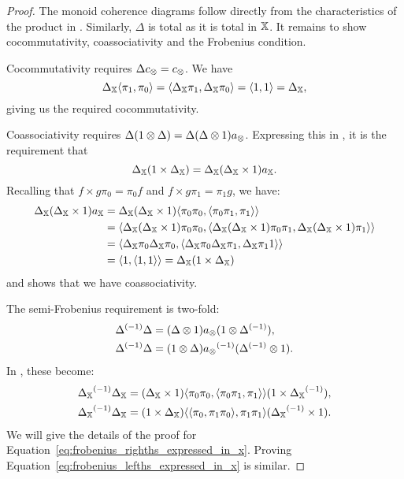 \begin{proof}
  The monoid coherence diagrams follow directly from the characteristics of the product in
  \X. Similarly, $\Delta$ is total as it is total in $\mathbb{X}$. It remains to show cocommutativity,
  coassociativity and the Frobenius condition.

  Cocommutativity requires $\Delta c_{\otimes} = c_{\otimes}$. We have
  \[
     \Delta_{\mathbb{X}} \langle \pi_1,\pi_0\rangle = \langle\Delta_{\mathbb{X}}\pi_1, \Delta_{\mathbb{X}}\pi_0\rangle = \langle1,1\rangle =
     \Delta_{\mathbb{X}},
  \]
  giving us the required cocommutativity.

  Coassociativity requires $\Delta (1 \otimes \Delta) = \Delta (\Delta \otimes 1) a_{\otimes}$. Expressing this
  in \X, it is the requirement that
  \[
    \Delta_{\mathbb{X}} (1 \times \Delta_{\mathbb{X}}) =
      \Delta_{\mathbb{X}}(\Delta_{\mathbb{X}} \times 1) a_{\mathbb{X}}.
  \]
  Recalling that $f\times g \pi_0 = \pi_0 f$ and $f\times g \pi_1 = \pi_1 g$, we have:
  \begin{align*}
    \Delta_{\mathbb{X}}(\Delta_{\mathbb{X}} \times 1) a_{\mathbb{X}} &=\Delta_{\mathbb{X}}(\Delta_{\mathbb{X}} \times 1)
    \langle\pi_0\pi_0,\langle\pi_0\pi_1,\pi_1\rangle\rangle\\
    &= \langle\Delta_{\mathbb{X}}(\Delta_{\mathbb{X}} \times 1)\pi_0\pi_0,\langle\Delta_{\mathbb{X}}(\Delta_{\mathbb{X}} \times 1)\pi_0\pi_1,\Delta_{\mathbb{X}}(\Delta_{\mathbb{X}} \times 1)\pi_1\rangle\rangle\\
    &= \langle\Delta_{\mathbb{X}}\pi_0\Delta_{\mathbb{X}}\pi_0,\langle\Delta_{\mathbb{X}}\pi_0\Delta_{\mathbb{X}}\pi_1,\Delta_{\mathbb{X}}\pi_1 1\rangle\rangle\\
    &= \langle1, \langle1,1\rangle\rangle = \Delta_{\mathbb{X}}(1\times\Delta_{\mathbb{X}})
  \end{align*}
  and shows that we have coassociativity.

  The semi-Frobenius requirement is two-fold:
  \begin{align}
    {\Delta}^{(-1)} \Delta &= (\Delta \otimes1) a_{\otimes}(1\otimes{\Delta}^{(-1)}), \label{eq:frobenius_righths_need_in_invx}\\
    {\Delta}^{(-1)} \Delta &= (1 \otimes \Delta) {a_{\otimes}}^{(-1)}({\Delta}^{(-1)}\otimes 1) \label{eq:frobenius_lefths_need_in_invx}.
  \end{align}
  In \X, these become:
  \begin{align}
    {\Delta_{\ensuremath{\mathbb{X}}}}^{(-1)} \Delta_{\mathbb{X}}
      &= (\Delta_{\mathbb{X}} \times 1) \langle\pi_0 \pi_0,\langle\pi_0 \pi_1,\pi_1\rangle\rangle(1\times{\Delta_{\ensuremath{\mathbb{X}}}}^{(-1)}),
      \label{eq:frobenius_righths_expressed_in_x}\\
    {\Delta_{\mathbb{X}}}^{(-1)}\Delta_{\mathbb{X}}
      &= (1 \times \Delta_{\mathbb{X}}) \langle\langle\pi_0, \pi_1 \pi_0\rangle,\pi_1 \pi_1\rangle({\Delta_{\mathbb{X}}}^{(-1)}\times 1).
      \label{eq:frobenius_lefths_expressed_in_x}
  \end{align}
  We will give the details of the proof for Equation~\ref{eq:frobenius_righths_expressed_in_x}.
  Proving Equation~\ref{eq:frobenius_lefths_expressed_in_x} is similar.


\end{proof}
